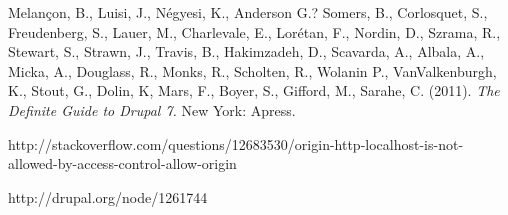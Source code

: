 \begin{thebibliography}{99}

 
 


 Melançon, B., Luisi, J., Négyesi, K., Anderson G.? Somers, B., Corlosquet, S., Freudenberg, S., Lauer, M., Charlevale, E., Lorétan, F., Nordin, D., Szrama, R., Stewart, S., Strawn, J., Travis, B., Hakimzadeh, D., Scavarda, A., Albala, A., Micka, A., Douglass, R., Monks, R., Scholten, R., Wolanin P., VanValkenburgh, K., Stout, G., Dolin, K, Mars, F., Boyer, S., Gifford, M., Sarahe, C. (2011). {\em The Definite Guide to Drupal 7.} New York: Apress.

 http://stackoverflow.com/questions/12683530/origin-http-localhost-is-not-allowed-by-access-control-allow-origin

 http://drupal.org/node/1261744

\end{thebibliography}

